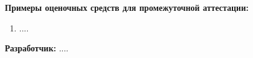 \documentclass[12pt]{scrartcl}
\newcommand{\rdf}[2]{#2}
\newenvironment{rdfctx}[1]{}{}
\renewcommand{\paragraph}[1]{\par\textbf{#1}}
\begin{document}
\paragraph{Примеры оценочных средств для промежуточной аттестации:}


\begin{rdfctx}{\rdfsetctx{list}{syll wpdd:itemList !wpdd:ExampleList !wpdd:IntermediateAttestation !wpdd:ItemList}}
\begin{enumerate}
\item \rdf{list ^schema:member !wpdd:ListItem !wpdd:Example}{....}
\end{enumerate}
\end{rdfctx}
\vspace{1em}
\vfill
\paragraph{\normalfont Разработчик:}%
\rdf{syll wpdd:courseDC schema:author {foaf:name rdf:label} !foaf:Person }{....} %
\end{document}
